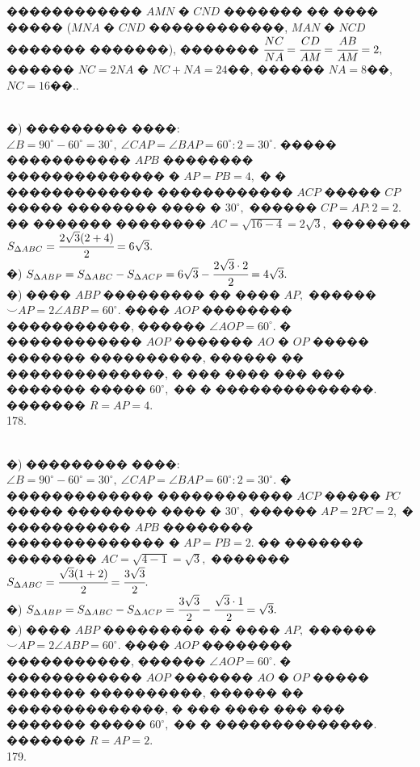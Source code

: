 \documentclass[12pt]{article}
\begin{document}
������������ $AMN$ � $CND$ ������� �� ���� ����� ($MNA$ � $CND$ ������������, $MAN$ � $NCD$ ������� �������), ������� $\cfrac{NC}{NA}=\cfrac{CD}{AM}=\cfrac{AB}{AM}=2,$ ������ $NC=2NA$ � $NC+NA=24$��, ������ $NA=8$��, $NC=16$��.\newpage{}. \begin{figure}[ht!]
\end{figure}\\
�) ��������� ����: $\angle B=90^\circ-60^\circ=30^\circ,\ \angle CAP=\angle BAP=60^\circ:2=30^\circ.$ ����� ����������� $APB$ �������� �������������� � $AP=PB=4,$ � � ������������� ������������ $ACP$ ����� $CP$ ����� �������� ���� � $30^\circ,$ ������ $CP=AP:2=2.$ �� ������� �������� $AC=\sqrt{16-4}=2\sqrt{3},$ ������� $S_{\Delta ABC}=\cfrac{2\sqrt{3}(2+4)}{2}=6\sqrt{3}.$\\
�) $S_{\Delta ABP}=S_{\Delta ABC}-S_{\Delta ACP}=6\sqrt{3}-\cfrac{2\sqrt{3}\cdot2}{2}=4\sqrt{3}.$\\
�) ���� $ABP$ ��������� �� ���� $AP,$ ������ $\smile AP=2\angle ABP=60^\circ.$ ���� $AOP$ �������� �����������, ������ $\angle AOP=60^\circ.$ � ������������ $AOP$ ������� $AO$ � $OP$ ����� ������� ����������, ������ �� ��������������, � ��� ���� ��� ��� ������� ����� $60^\circ,$ �� � ��������������. ������� $R=AP=4.$\\
178. \begin{figure}[ht!]
\end{figure}\\
�) ��������� ����: $\angle B=90^\circ-60^\circ=30^\circ,\ \angle CAP=\angle BAP=60^\circ:2=30^\circ.$ � ������������� ������������ $ACP$ ����� $PC$ ����� �������� ���� � $30^\circ,$ ������ $AP=2PC=2,$ � ����������� $APB$ �������� �������������� � $AP=PB=2.$ �� ������� �������� $AC=\sqrt{4-1}=\sqrt{3},$ ������� $S_{\Delta ABC}=\cfrac{\sqrt{3}(1+2)}{2}=\cfrac{3\sqrt{3}}{2}.$\\
�) $S_{\Delta ABP}=S_{\Delta ABC}-S_{\Delta ACP}=\cfrac{3\sqrt{3}}{2}-\cfrac{\sqrt{3}\cdot1}{2}=\sqrt{3}.$\\
�) ���� $ABP$ ��������� �� ���� $AP,$ ������ $\smile AP=2\angle ABP=60^\circ.$ ���� $AOP$ �������� �����������, ������ $\angle AOP=60^\circ.$ � ������������ $AOP$ ������� $AO$ � $OP$ ����� ������� ����������, ������ �� ��������������, � ��� ���� ��� ��� ������� ����� $60^\circ,$ �� � ��������������. ������� $R=AP=2.$\\
179. \begin{figure}[ht!]
\end{figure}\\
\end{document}
